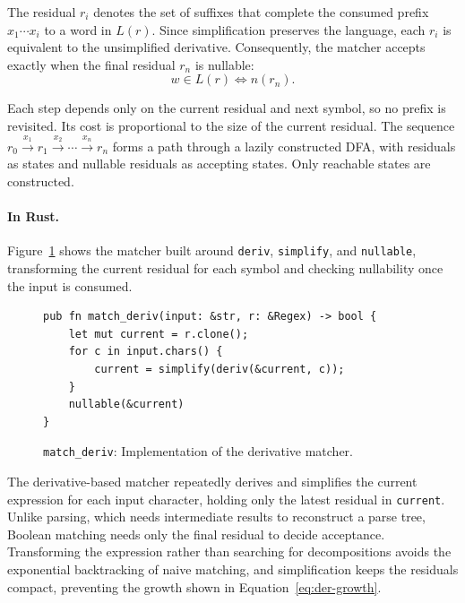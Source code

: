 The residual $r_i$ denotes the set of suffixes that complete
the consumed prefix $x_1\cdots x_i$ to a word in $L(r)$.
Since simplification preserves the language, 
each $r_i$ is equivalent to the unsimplified derivative.
Consequently, the matcher accepts exactly when the final
residual $r_n$ is nullable:
\begin{equation}
\label{eq:deriv-accept}
w\in L(r)\iff n(r_n).
\end{equation}

Each step depends only on the current residual and next symbol,
so no prefix is revisited. 
Its cost is proportional to the size of the current residual. 
The sequence $r_0\xrightarrow{x_1}r_1\xrightarrow{x_2}\cdots\xrightarrow{x_n}r_n$
forms a path through a lazily constructed DFA, 
with residuals as states and nullable residuals as accepting states. 
Only reachable states are constructed.

%

\paragraph{In Rust.}
Figure~\ref{fig:match-deriv-rust} shows the matcher built around
\texttt{deriv}, \texttt{simplify}, and \texttt{nullable}, 
transforming the current residual for each symbol 
and checking nullability once the input is consumed.

\begin{figure}[H]
\small
\begin{verbatim}
pub fn match_deriv(input: &str, r: &Regex) -> bool {
    let mut current = r.clone();
    for c in input.chars() {
        current = simplify(deriv(&current, c));
    }
    nullable(&current)
}
\end{verbatim}
\caption{\texttt{match\_deriv}: Implementation of the derivative matcher.}
\label{fig:match-deriv-rust}
\end{figure}

The derivative-based matcher repeatedly
derives and simplifies the current expression for each input character,
holding only the latest residual in \texttt{current}. 
Unlike parsing, which needs intermediate results 
to reconstruct a parse tree, 
Boolean matching needs only the final residual to decide acceptance. 
Transforming the expression 
rather than searching for decompositions avoids the exponential backtracking 
of naive matching, and simplification keeps the residuals compact, 
preventing the growth shown in Equation~\eqref{eq:der-growth}.

%
%
%

